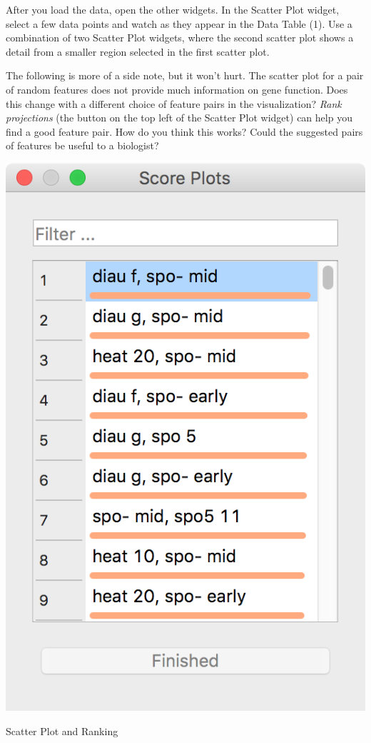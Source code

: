 After you load the data, open the other widgets. In the Scatter Plot widget, select a few data points and watch as they appear in the Data Table (1). Use a combination of two Scatter Plot widgets, where the second scatter plot shows a detail from a smaller region selected in the first scatter plot.

The following is more of a side note, but it won't hurt. The scatter plot for a pair of random features does not provide much information on gene function. Does this change with a different choice of feature pairs in the visualization? \textit{Rank projections} (the button on the top left of the Scatter Plot widget) can help you find a good feature pair. How do you think this works? Could the suggested pairs of features be useful to a biologist?

\begin{marginfigure}[4cm]
  \includegraphics[width=0.9\linewidth]{score-plots.png}
  \caption{Scatter Plot and Ranking}
\end{marginfigure}

